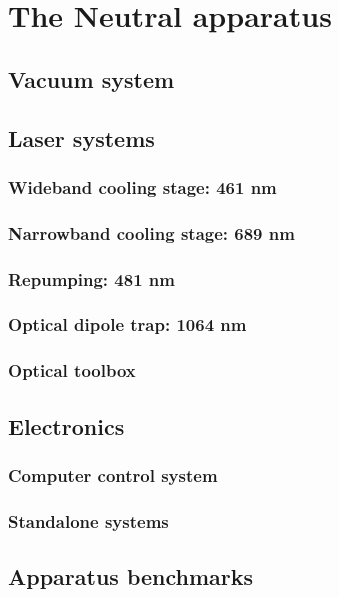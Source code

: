 \chapter{The Neutral apparatus}
\label{ch:chap2}

\section{Vacuum system}
\label{sec:vac}

\section{Laser systems}
\label{sec:laser_systems}

\subsection{Wideband cooling stage: 461 nm}
\label{ssec:461sys}

\subsection{Narrowband cooling stage: 689 nm}
\label{ssec:689sys}

\subsection{Repumping: 481 nm}
\label{ssec:481sys}

\subsection{Optical dipole trap: 1064 nm}
\label{ssec:1064sys}

\subsection{Optical toolbox}
\label{ssec:op_tools}

\section{Electronics}
\label{sec:electronics}

\subsection{Computer control system}
\label{ssec:comp_sys}

\subsection{Standalone systems}
\label{ssec:misc_sys}

\section{Apparatus benchmarks}
\label{sec:app_scores}